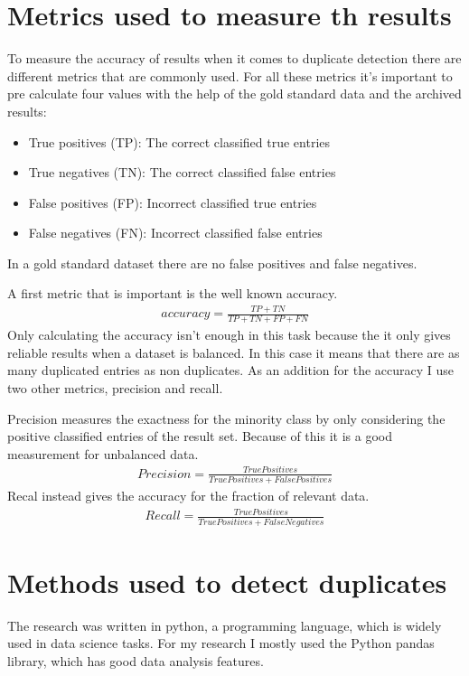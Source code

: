 \documentclass[conference]{IEEEtran}
\begin{document}
\section{Metrics used to measure th results}
To measure the accuracy of results when it comes to duplicate detection there are different metrics that are commonly used. For all these metrics it's important to pre calculate four values with the help of the gold standard data and the archived results: 
\begin{itemize}
	\item True positives (TP): The correct classified true entries
	\item True negatives (TN): The correct classified false entries
	\item False positives (FP): Incorrect classified true entries
	\item False negatives (FN): Incorrect classified false entries
\end{itemize}
In a gold standard dataset there are no false positives and false negatives.

A first metric that is important is the well known accuracy. 
\begin{align}
 accuracy =  \frac{TP + TN}{TP + TN + FP + FN}
\end{align}
Only calculating the accuracy isn't enough in this task because the it only gives reliable results when a dataset is balanced. In this case it means that there are as many duplicated entries as non duplicates. As an addition for the accuracy I use two other metrics, precision and recall.

Precision measures the exactness for the minority class by only considering the positive classified entries of the result set. Because of this it is a good measurement for unbalanced data.
\begin{align}
	Precision = \frac{TruePositives}{TruePositives + FalsePositives}
\end{align}
Recal instead gives the accuracy for the fraction of relevant data.
\begin{align}
	Recall = \frac{TruePositives}{TruePositives + FalseNegatives}
\end{align}
\section{Methods used to detect duplicates} \label{sec_methods}
The research was written in python, a programming language, which is widely used in data science tasks. For my research I mostly used the Python pandas library, which has good data analysis features. 
\end{document}
